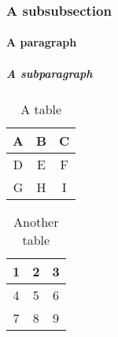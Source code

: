 \subsubsection{A subsubsection}

\paragraph{A paragraph}

\subparagraph{A subparagraph}



\begin{table}
  \centering
  \caption{A table}
  \begin{tabular}{|c|c|c|}
    \hline
    A & B & C \\\hline
    D & E & F \\\hline
    G & H & I \\
    \hline
  \end{tabular}

  \tableSpace
\end{table}


\begin{table}
  \centering
  \caption{Another table}
  \begin{tabular}{|c|c|c|}
    \hline
    1 & 2 & 3 \\\hline
    4 & 5 & 6 \\\hline
    7 & 8 & 9 \\
    \hline
  \end{tabular}

  \tableSpace
\end{table}
